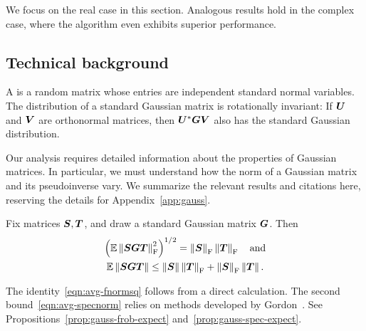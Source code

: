\documentclass[final]{siamltex}
\newcounter{algorithm}[section]
\begin{document}
We focus on the real case in this section.  Analogous results hold
in the complex case, where the algorithm even exhibits superior
performance.

\subsection{Technical background}

A  is a random matrix whose
entries are independent standard normal variables.
The distribution of a standard Gaussian matrix is rotationally invariant:
If $\bm{U}$ and $\bm{V}$ are orthonormal matrices, then $\bm{U}^*
\bm{G} \bm{V}$ also has the standard Gaussian distribution.

Our analysis requires detailed information about the properties of Gaussian
matrices.  In particular, we must understand how the norm of a Gaussian
matrix and its pseudoinverse vary.  We summarize the relevant results
and citations here, reserving the details for Appendix~\ref{app:gauss}.


\lsp

\begin{proposition} \label{prop:scaled-gauss}
Fix matrices $\bm{S}, \bm{T}$, and draw a standard Gaussian matrix $\bm{G}$.  Then
\begin{gather}
\left( \Expect \fnormsq{ \mtx{SGT} } \right)^{1/2}
    = \fnorm{\mtx{S}} \fnorm{\mtx{T}}
    \quad\text{and}
    \label{eqn:avg-fnormsq} \\
\Expect \norm{ \mtx{SGT} }
    \leq \norm{\mtx{S}} \fnorm{\mtx{T}} + \fnorm{\mtx{S}} \norm{\mtx{T}}.
    \label{eqn:avg-specnorm}
\end{gather}
\end{proposition}


The identity~\eqref{eqn:avg-fnormsq} follows from a direct
calculation.  The second bound~\eqref{eqn:avg-specnorm} relies on
methods developed by
Gordon~\cite{Gor85:Some-Inequalities,Gor88:Gaussian-Processes}.
See Propositions~\ref{prop:gauss-frob-expect}
and~\ref{prop:gauss-spec-expect}.
\end{document}
